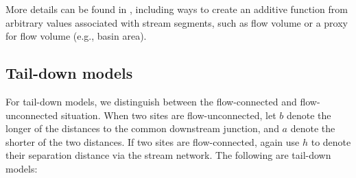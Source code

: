 \documentclass[nojss]{jss}
\begin{document}
More details can be found in \citet{Ver:Pete:Move:2010}, including
ways to create an additive function from arbitrary values associated
with stream segments, such as flow volume or a proxy for flow volume
(e.g., basin area).


\subsection{Tail-down models}\label{taildown}

For tail-down models, we distinguish between the flow-connected and
flow-unconnected situation.  When two sites are flow-unconnected, let
$b$ denote the longer of the distances to the common downstream
junction, and $a$ denote the shorter of the two distances.  If two
sites are flow-connected, again use $h$ to denote their separation
distance via the stream network. The following are tail-down models:
\end{document}
